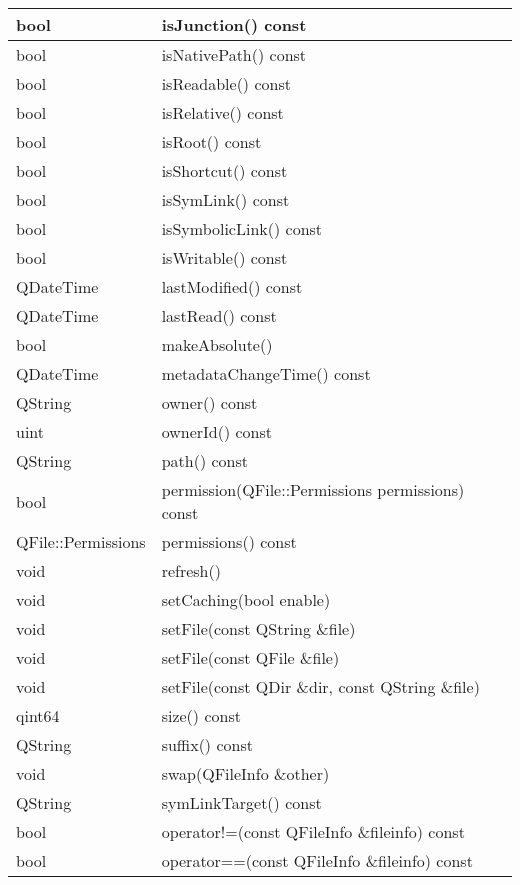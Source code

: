 \begin{longtable}{|l|l|}
\hline
bool& 	isJunction() const\\
\hline
bool& 	isNativePath() const\\
\hline
bool& 	isReadable() const\\
\hline
bool& 	isRelative() const\\
\hline
bool& 	isRoot() const\\
\hline
bool& 	isShortcut() const\\
\hline
bool& 	isSymLink() const\\
\hline
bool& 	isSymbolicLink() const\\
\hline
bool& 	isWritable() const\\
\hline
QDateTime& 	lastModified() const\\
\hline
QDateTime& 	lastRead() const\\
\hline
bool& 	makeAbsolute()\\
\hline
QDateTime& 	metadataChangeTime() const\\
\hline
QString& 	owner() const\\
\hline
uint& 	ownerId() const\\
\hline
QString& 	path() const\\
\hline
bool& 	permission(QFile::Permissions permissions) const\\
\hline
QFile::Permissions& 	permissions() const\\
\hline
void& 	refresh()\\
\hline
void& 	setCaching(bool enable)\\
\hline
void& 	setFile(const QString \&file)\\
\hline
void& 	setFile(const QFile \&file)\\
\hline
void& 	setFile(const QDir \&dir, const QString \&file)\\
\hline
qint64& 	size() const\\
\hline
QString& 	suffix() const\\
\hline
void& 	swap(QFileInfo \&other)\\
\hline
QString& 	symLinkTarget() const\\
\hline
bool& 	operator!=(const QFileInfo \&fileinfo) const\\
\hline
bool& 	operator==(const QFileInfo \&fileinfo) const\\
\hline
\end{longtable}

